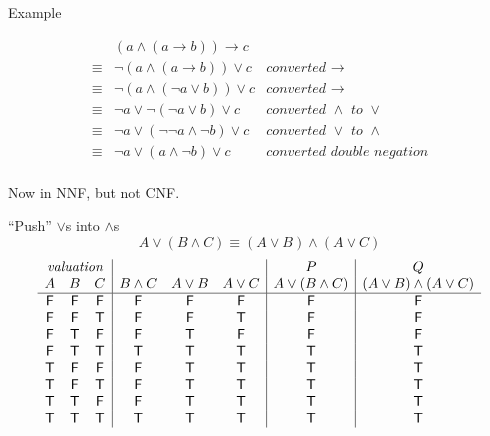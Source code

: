 \documentclass[xetex,aspectratio=169,14pt,hyperref={pdfpagelabels=true,pdflang={en-GB}}]{beamer}
\begin{document}
\begin{frame}
  {Example}

  \begin{displaymath}
    \begin{array}{cll}
             & (a \land (a \to b)) \to c \\
      \equiv & \lnot (a \land (a \to b)) \lor c & \textit{converted }\to\\
      \equiv & \lnot (a \land (\lnot a \lor b)) \lor c & \textit{converted }\to\\
      \equiv & \lnot a \lor \lnot (\lnot a \lor b) \lor c & \textit{converted }\land\textit{ to }\lor \\
      \equiv & \lnot a \lor (\lnot \lnot a \land \lnot b) \lor c & \textit{converted }\lor\textit{ to }\land \\
      \equiv & \lnot a \lor (a \land \lnot b) \lor c & \textit{converted double negation} \\
    \end{array}
  \end{displaymath}

  \bigskip

  Now in NNF, but not CNF.
\end{frame}

\begin{frame}
  {``Push'' $\lor$s into $\land$s}
  \begin{displaymath}
    A \lor (B \land C) \equiv (A \lor B) \land (A \lor C)
  \end{displaymath}
  {\footnotesize\begin{displaymath}
    \begin{array}{ccc|ccc|c|c}
      \multicolumn{3}{c|}{\textit{valuation}}&&&&P&Q\\
      A & B & C       & B \land C & A \lor B & A \lor C & A \lor (B \land C) & (A \lor B) \land (A \lor C) \\
      \hline
      \false & \false & \false & \false       & \false      & \false      & \false                & \false \\
      \false & \false & \true  & \false       & \false      & \true       & \false                & \false \\
      \false & \true  & \false & \false       & \true       & \false      & \false                & \false \\
      \false & \true  & \true  & \true        & \true       & \true       & \true                 & \true  \\
      \true  & \false & \false & \false       & \true       & \true       & \true                 & \true  \\
      \true  & \false & \true  & \false       & \true       & \true       & \true                 & \true  \\
      \true  & \true  & \false & \false       & \true       & \true       & \true                 & \true  \\
      \true  & \true  & \true  & \true        & \true       & \true       & \true                 & \true  \\
    \end{array}
  \end{displaymath}}
\end{frame}
\end{document}
